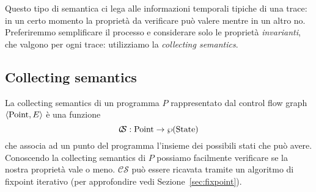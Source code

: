 Questo tipo di semantica ci lega alle informazioni temporali tipiche di una trace: in un certo momento la proprietà da verificare può valere mentre in un altro no. Preferiremmo semplificare il processo e considerare solo le proprietà \emph{invarianti}, che valgono per ogni trace: utilizziamo la \emph{collecting semantics}.

\subsection{Collecting semantics}

La collecting semantics di un programma $P$ rappresentato dal control flow graph $\langle \mathrm{Point}, E \rangle$ è una funzione
\[ \mathcal{C\!\!S} : \mathrm{Point} \to \wp(\mathrm{State}) \]
che associa ad un punto del programma l'insieme dei possibili stati che può avere. Conoscendo la collecting semantics di $P$ possiamo facilmente verificare se la nostra proprietà vale o meno. $\mathcal{C\!\!S}$ può essere ricavata tramite un algoritmo di fixpoint iterativo (per approfondire vedi Sezione~\ref{sec:fixpoint}). 


